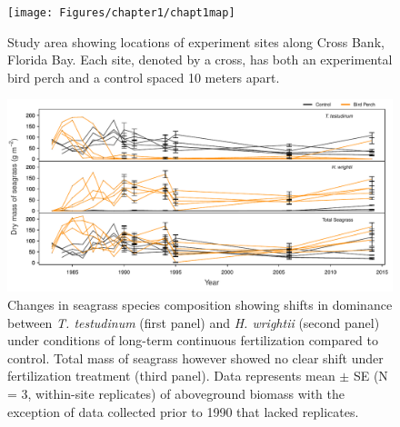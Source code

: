 \renewcommand{\section}[2]{}%


\endgroup


\begin{figure}
  \centering
  \texttt{[image: Figures/chapter1/chapt1map]}
\caption[Map of study area]{Study area showing locations of experiment sites along Cross Bank, Florida Bay. Each site, denoted by a cross, has both an experimental bird perch and a control spaced 10 meters apart.}
  \label{fig:map}
\end{figure}


\begin{figure}
  \centering
  \includegraphics[width=.99\textwidth]{Figures/chapter1/fig1}
\caption[Changes in seagrass species composition]{Changes in seagrass species composition showing shifts in dominance between \textit{T. testudinum} (first panel) and \textit{H. wrightii} (second panel) under conditions of long-term continuous fertilization compared to control. Total mass of seagrass however showed no clear shift under fertilization treatment (third panel). Data represents mean $\pm$ SE (N = 3, within-site replicates) of aboveground biomass with the exception of data collected prior to 1990 that lacked replicates.}
  \label{fig:1fig1}
\end{figure}

